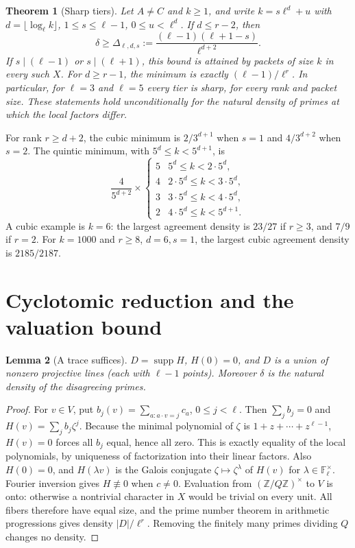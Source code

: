 \documentclass[11pt]{article}
\newtheorem{theorem}{Theorem}[section]
\newtheorem{lemma}[theorem]{Lemma}
\theoremstyle{remark}\newtheorem{remark}[theorem]{Remark}
\newcommand{\F}{\mathbb F}
\newcommand{\Z}{\mathbb Z}
\newcommand{\supp}{\operatorname{supp}}
\newcommand{\abs}[1]{\lvert#1\rvert}
\begin{document}
\begin{theorem}[Sharp tiers]\label{thm:main}
Let $A\ne C$ and $k\ge1$, and write $k= s\ell^d+u$ with $d=\lfloor\log_\ell k\rfloor$, $1\le s\le\ell-1$, $0\le u<\ell^d$. If $d\le r-2$, then
\begin{equation}\label{eq:main}
 \delta\ge \Delta_{\ell,d,s}:=\frac{(\ell-1)(\ell+1-s)}{\ell^{d+2}}.
\end{equation}
If $s\mid(\ell-1)$ or $s\mid(\ell+1)$, this bound is attained by packets of size $k$ in every such $X$. For $d\ge r-1$, the minimum is exactly $(\ell-1)/\ell^r$. In particular, for $\ell=3$ and $\ell=5$ every tier is sharp, for every rank and packet size. These statements hold unconditionally for the natural density of primes at which the local factors differ.
\end{theorem}

For rank $r\ge d+2$, the cubic minimum is $2/3^{d+1}$ when $s=1$ and $4/3^{d+2}$ when $s=2$. The quintic minimum, with $5^d\le k<5^{d+1}$, is
\begin{equation}\label{eq:quintic}
\frac{4}{5^{d+2}}\times
\begin{cases}5&5^d\le k<2\cdot5^d,\\4&2\cdot5^d\le k<3\cdot5^d,\\3&3\cdot5^d\le k<4\cdot5^d,\\2&4\cdot5^d\le k<5^{d+1}.\end{cases}
\end{equation}
A cubic example is $k=6$: the largest agreement density is $23/27$ if $r\ge3$, and $7/9$ if $r=2$. For $k=1000$ and $r\ge8$, $d=6,s=1$, the largest cubic agreement density is $2185/2187$.

\section{Cyclotomic reduction and the valuation bound}
\begin{lemma}[A trace suffices]\label{lem:trace}
$D=\supp H$, $H(0)=0$, and $D$ is a union of nonzero projective lines (each with $\ell-1$ points). Moreover $\delta$ is the natural density of the disagreeing primes.
\end{lemma}
\begin{proof}
For $v\in V$, put $b_j(v)=\sum_{a:a\cdot v=j}c_a$, $0\le j<\ell$. Then $\sum_j b_j=0$ and $H(v)=\sum_j b_j\zeta^j$. Because the minimal polynomial of $\zeta$ is $1+z+\cdots+z^{\ell-1}$, $H(v)=0$ forces all $b_j$ equal, hence all zero. This is exactly equality of the local polynomials, by uniqueness of factorization into their linear factors. Also $H(0)=0$, and $H(\lambda v)$ is the Galois conjugate $\zeta\mapsto\zeta^\lambda$ of $H(v)$ for $\lambda\in\F_\ell^\times$. Fourier inversion gives $H\not\equiv0$ when $c\ne0$. Evaluation from $(\Z/Q\Z)^\times$ to $V$ is onto: otherwise a nontrivial character in $X$ would be trivial on every unit. All fibers therefore have equal size, and the prime number theorem in arithmetic progressions gives density $\abs D/\ell^r$. Removing the finitely many primes dividing $Q$ changes no density.
\end{proof}
\end{document}
